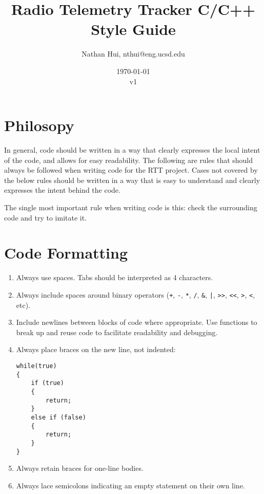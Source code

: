 \documentclass{article}
\title{Radio Telemetry Tracker C/C++ Style Guide}
\author{Nathan Hui, nthui@eng.ucsd.edu}
\date{\today\\v1}
\begin{document}
\maketitle
\section{Philosopy}
In general, code should be written in a way that clearly expresses the local intent of the code, and allows for easy readability.  The following are rules that should always be followed when writing code for the RTT project.  Cases not covered by the below rules should be written in a way that is easy to understand and clearly expresses the intent behind the code.

The single most important rule when writing code is this: check the surrounding code and try to imitate it.
\section{Code Formatting}
\begin{enumerate}
    \item Always use spaces.  Tabs should be interpreted as 4 characters.
    \item Always include spaces around binary operators (\lstinline{+}, \lstinline{-}, \lstinline{*}, \lstinline{/}, \lstinline{&}, \lstinline{|}, \lstinline{>>}, \lstinline{<<}, \lstinline{>}, \lstinline{<}, etc).
    \item Include newlines between blocks of code where appropriate.  Use functions to break up and reuse code to facilitate readability and debugging.
    \item Always place braces on the new line, not indented:

\begin{lstlisting}[style=customc]
while(true)
{
    if (true)
    {
        return;
    }
    else if (false)
    {
        return;
    }
}
\end{lstlisting}

    \item Always retain braces for one-line bodies.
    \item Always lace semicolons indicating an empty statement on their own line.

\end{enumerate}
\end{document}
